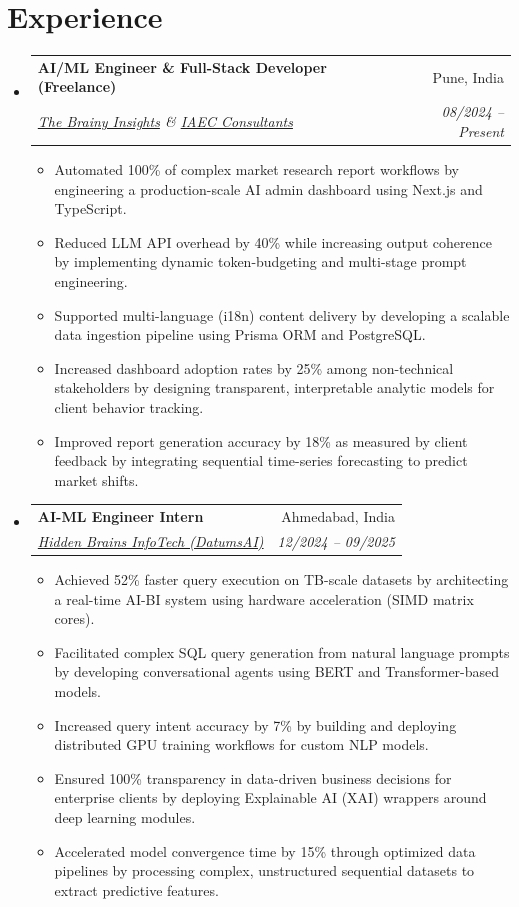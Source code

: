 \documentclass[10pt,a4paper]{article}
\makeatletter
\newcommand{\resumeItem}[1]{\item\small{#1}}
\newcommand{\resumeSubheading}[4]{
  \vspace{-1pt}\item
    \begin{tabular*}{1.0\textwidth}[t]{l@{\extracolsep{\fill}}r}
      \textbf{#1} & #2 \\
      \textit{\small#3} & \textit{\small #4} \\
    \end{tabular*}\vspace{-5pt}
}
\makeatother
\begin{document}
\section{Experience}
\begin{itemize}[label={}]
    \resumeSubheading
      {AI/ML Engineer \& Full-Stack Developer (Freelance)}{Pune, India}
      {\href{https://thebrainyinsights.com}{The Brainy Insights} \& \href{https://iaec.co.in}{IAEC Consultants}}{08/2024 -- Present}
      \begin{itemize}
        \resumeItem{Automated 100\% of complex market research report workflows by engineering a production-scale AI admin dashboard using Next.js and TypeScript.}
        \resumeItem{Reduced LLM API overhead by 40\% while increasing output coherence by implementing dynamic token-budgeting and multi-stage prompt engineering.}
        \resumeItem{Supported multi-language (i18n) content delivery by developing a scalable data ingestion pipeline using Prisma ORM and PostgreSQL.}
        \resumeItem{Increased dashboard adoption rates by 25\% among non-technical stakeholders by designing transparent, interpretable analytic models for client behavior tracking.}
        \resumeItem{Improved report generation accuracy by 18\% as measured by client feedback by integrating sequential time-series forecasting to predict market shifts.}
      \end{itemize}

    \resumeSubheading
      {AI-ML Engineer Intern}{Ahmedabad, India}
      {\href{https://hiddenbrains.com}{Hidden Brains InfoTech (DatumsAI)}}{12/2024 -- 09/2025}
      \begin{itemize}
        \resumeItem{Achieved 52\% faster query execution on TB-scale datasets by architecting a real-time AI-BI system using hardware acceleration (SIMD matrix cores).}
        \resumeItem{Facilitated complex SQL query generation from natural language prompts by developing conversational agents using BERT and Transformer-based models.}
        \resumeItem{Increased query intent accuracy by 7\% by building and deploying distributed GPU training workflows for custom NLP models.}
        \resumeItem{Ensured 100\% transparency in data-driven business decisions for enterprise clients by deploying Explainable AI (XAI) wrappers around deep learning modules.}
        \resumeItem{Accelerated model convergence time by 15\% through optimized data pipelines by processing complex, unstructured sequential datasets to extract predictive features.}
      \end{itemize}


\end{itemize}
\end{document}
